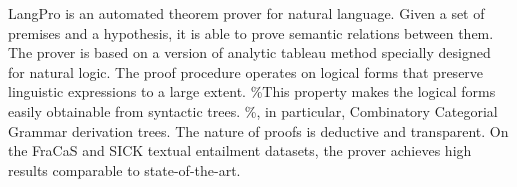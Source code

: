 LangPro is an automated theorem prover for natural language. Given a set of premises and a hypothesis, it is able to prove semantic relations between them. The prover is based on a version of analytic tableau method specially designed for natural logic. The proof procedure operates on logical forms that preserve linguistic expressions to a large extent. \%This property makes the logical forms easily obtainable from syntactic trees. \%, in particular, Combinatory Categorial Grammar derivation trees. The nature of proofs is deductive and transparent. On the FraCaS and SICK textual entailment datasets, the prover achieves high results comparable to state-of-the-art.
